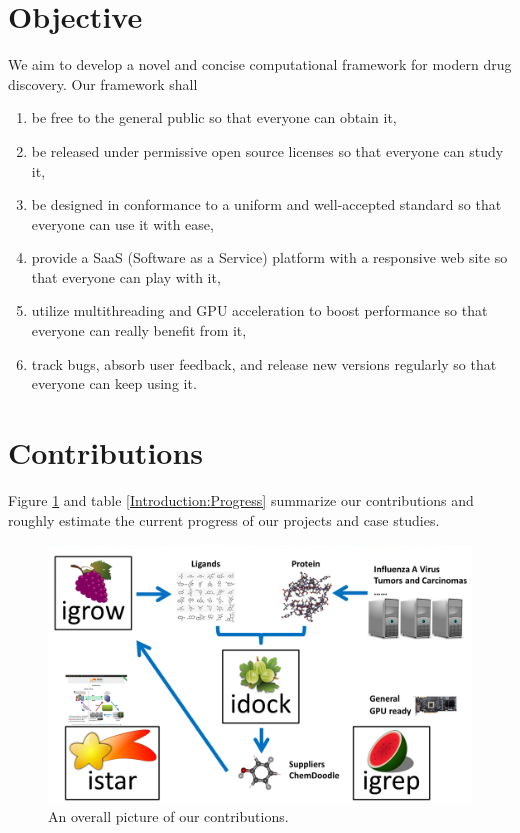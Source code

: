 \section{Objective}

We aim to develop a novel and concise computational framework for modern drug discovery. Our framework shall
\begin{enumerate}
\item be free to the general public so that everyone can obtain it,
\item be released under permissive open source licenses so that everyone can study it,
\item be designed in conformance to a uniform and well-accepted standard so that everyone can use it with ease,
\item provide a SaaS (Software as a Service) platform with a responsive web site so that everyone can play with it,
\item utilize multithreading and GPU acceleration to boost performance so that everyone can really benefit from it,
\item track bugs, absorb user feedback, and release new versions regularly so that everyone can keep using it.
\end{enumerate}

\section{Contributions}

Figure \ref{Introduction:Contributions} and table \ref{Introduction:Progress} summarize our contributions and roughly estimate the current progress of our projects and case studies.

\begin{figure}
\centering
\includegraphics[width=\textwidth]{Introduction/Contributions.png}
\caption{An overall picture of our contributions.}
\label{Introduction:Contributions}
\end{figure}

